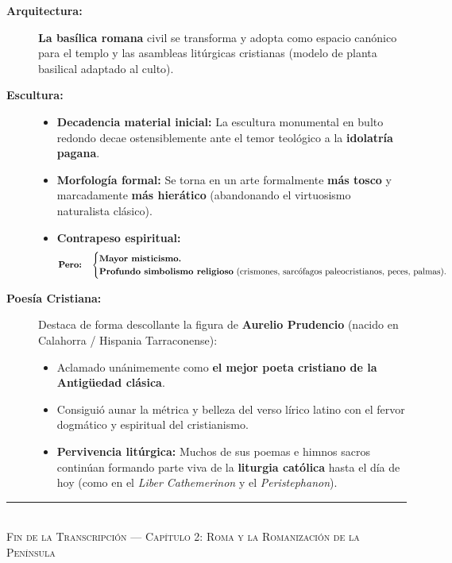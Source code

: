 \documentclass[11pt,letterpaper]{article}
\begin{document}
\begin{description}
  \item[\textbf{Arquitectura:}]
  \textbf{La basílica romana} civil se transforma y adopta como espacio canónico para el templo y las asambleas litúrgicas cristianas (modelo de planta basilical adaptado al culto).

  \item[\textbf{Escultura:}]
  \begin{itemize}
    \item \textbf{Decadencia material inicial:} La escultura monumental en bulto redondo decae ostensiblemente ante el temor teológico a la \textbf{idolatría pagana}.
    \item \textbf{Morfología formal:} Se torna en un arte formalmente \textbf{más tosco} y marcadamente \textbf{más hierático} (abandonando el virtuosismo naturalista clásico).
    \item \textbf{Contrapeso espiritual:}
    \[
      \text{\textbf{Pero:}}\quad \begin{cases}
        \textbf{Mayor misticismo.} \\
        \textbf{Profundo simbolismo religioso} \text{ (crismones, sarcófagos paleocristianos, peces, palmas).}
      \end{cases}
    \]
  \end{itemize}

  \item[\textbf{Poesía Cristiana:}]
  Destaca de forma descollante la figura de \textbf{Aurelio Prudencio} (nacido en Calahorra / Hispania Tarraconense):
  \begin{subbox}
    \begin{itemize}
      \item Aclamado unánimemente como \textbf{el mejor poeta cristiano de la Antigüedad clásica}.
      \item Consiguió aunar la métrica y belleza del verso lírico latino con el fervor dogmático y espiritual del cristianismo.
      \item \textbf{Pervivencia litúrgica:} Muchos de sus poemas e himnos sacros continúan formando parte viva de la \textbf{liturgia católica} hasta el día de hoy (como en el \textit{Liber Cathemerinon} y el \textit{Peristephanon}).
    \end{itemize}
  \end{subbox}
\end{description}

\vspace{1.5cm}
\begin{center}
  \rule{0.4\linewidth}{0.4pt}\\[6pt]
  {\footnotesize\color{gray}\textsc{Fin de la Transcripción --- Capítulo 2: Roma y la Romanización de la Península}}
\end{center}
\end{document}
